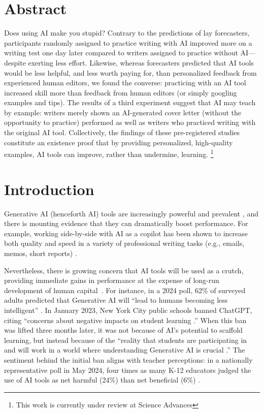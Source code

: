 \documentclass[11pt]{report}
\begin{document}
\begin{mainf}
\section{Abstract}
Does using AI make you stupid? Contrary to the predictions of lay forecasters, participants randomly assigned to practice writing with AI improved more on a writing test one day later compared to writers assigned to practice without AI—despite exerting less effort. Likewise, whereas forecasters predicted that AI tools would be less helpful, and less worth paying for, than personalized feedback from experienced human editors, we found the converse: practicing with an AI tool increased skill more than feedback from human editors (or simply googling examples and tips). The results of a third experiment suggest that AI may teach by example: writers merely shown an AI-generated cover letter (without the opportunity to practice) performed as well as writers who practiced writing with the original AI tool. Collectively, the findings of these pre-registered studies constitute an existence proof that by providing personalized, high-quality examples, AI tools can improve, rather than undermine, learning.  
\footnote{This work is currently under review at Science Advances} 

\section{Introduction}

Generative AI (henceforth AI) tools are increasingly powerful and prevalent \cite{bubeck2023}, and there is mounting evidence that they can dramatically boost performance. 
  For example, working side-by-side with AI as a copilot has been shown to increase both quality and speed in a variety of professional writing tasks (e.g., emails, memos, short reports) \cite{noy2023, dellacqua2023, wiles2023algorithmic}.

Nevertheless, there is growing concern that AI tools will be used as a crutch, providing immediate gains in performance at the expense of long-run development of human capital~\cite{hofman2023sports, puntoni2021, borges2024}.
  For instance, in a 2024 poll, 62\% of surveyed adults predicted that Generative AI will ``lead to humans becoming less intelligent'' \cite{hawkins2024between}.
  In January 2023, New York City public schools banned ChatGPT, citing ``concerns about negative impacts on student learning \cite{roose2023}.'' 
  When this ban was lifted three months later, it was not because of AI’s potential to scaffold learning, but instead because of the ``reality that students are participating in and will work in a world where understanding Generative AI is crucial \cite{banks2023}.'' 
  The sentiment behind the initial ban aligns with teacher perceptions: 
  in a nationally representative poll in May 2024, four times as many K-12 educators judged the use of AI tools as net harmful (24\%) than net beneficial (6\%) \cite{lin2024a}. 


\end{mainf}
\end{document}
